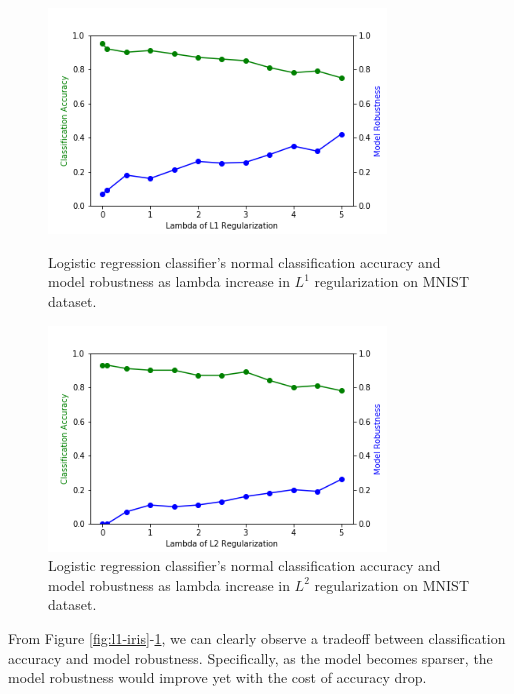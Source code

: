 \documentclass{article}
\begin{document}
\begin{figure}[H]
  \centering
  \begin{minipage}{0.48\textwidth}
  \centering
  \includegraphics[width=0.8\textwidth]{sparsity_l1.png}
  \caption{Logistic regression classifier's normal classification accuracy and model robustness as lambda increase in $L^{1}$ regularization on MNIST dataset. }
  \label{fig:l1-mnist}
  \end{minipage}
  \hfill
  \begin{minipage}{0.48\textwidth}
  \centering
    \includegraphics[width=0.8\textwidth]{sparsity.png}
  \caption{Logistic regression classifier's normal classification accuracy and model robustness as lambda increase in $L^{2}$ regularization on MNIST dataset. }
  \label{fig:l2-mnist}
  \end{minipage}
  \hfill
\end{figure}

From Figure \ref{fig:l1-iris}-\ref{fig:l2-mnist}, we can clearly observe a tradeoff between classification accuracy and model robustness. Specifically, as the model becomes sparser, the model robustness would improve yet with the cost of accuracy drop. 
\end{document}
